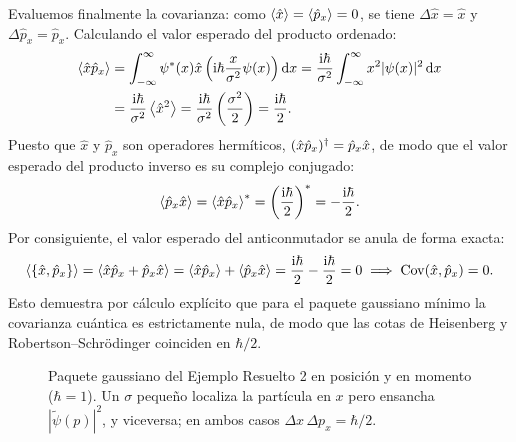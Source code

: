 \begin{ejemplobox}
    Evaluemos finalmente la covarianza: como $\left\langle \hat{x} \right\rangle = \left\langle \hat{p}_x \right\rangle = 0$, se tiene $\Delta\hat{x} = \hat{x}$ y $\Delta\hat{p}_x = \hat{p}_x$. Calculando el valor esperado del producto ordenado:
    \begin{align}
        \left\langle \hat{x}\hat{p}_x \right\rangle &= \int_{-\infty}^\infty \psi^*(x)\hat{x}\left(\mathrm{i}\hbar\frac{x}{\sigma^2}\psi(x)\right)\mathrm{d} x = \frac{\mathrm{i}\hbar}{\sigma^2}\int_{-\infty}^\infty x^2 |\psi(x)|^2\,\mathrm{d} x \nonumber\\
        &= \frac{\mathrm{i}\hbar}{\sigma^2}\left\langle \hat{x}^2 \right\rangle = \frac{\mathrm{i}\hbar}{\sigma^2}\left(\frac{\sigma^2}{2}\right) = \frac{\mathrm{i}\hbar}{2}.
        \label{a2-eq:xp_exp}
    \end{align}
    Puesto que $\hat{x}$ y $\hat{p}_x$ son operadores hermíticos, $(\hat{x}\hat{p}_x)^\dagger = \hat{p}_x\hat{x}$, de modo que el valor esperado del producto inverso es su complejo conjugado:
    \begin{equation}
        \left\langle \hat{p}_x\hat{x} \right\rangle = \left\langle \hat{x}\hat{p}_x \right\rangle^* = \left(\frac{\mathrm{i}\hbar}{2}\right)^* = -\frac{\mathrm{i}\hbar}{2}.
        \label{a2-eq:px_exp}
    \end{equation}
    Por consiguiente, el valor esperado del anticonmutador se anula de forma exacta:
    \begin{equation}
        \left\langle \{\hat{x}, \hat{p}_x\} \right\rangle = \left\langle \hat{x}\hat{p}_x + \hat{p}_x\hat{x} \right\rangle = \left\langle \hat{x}\hat{p}_x \right\rangle + \left\langle \hat{p}_x\hat{x} \right\rangle = \frac{\mathrm{i}\hbar}{2} - \frac{\mathrm{i}\hbar}{2} = 0 \implies \mathrm{Cov}(\hat{x}, \hat{p}_x) = 0.
    \end{equation}
    Esto demuestra por cálculo explícito que para el paquete gaussiano mínimo la covarianza cuántica es estrictamente nula, de modo que las cotas de Heisenberg y Robertson--Schrödinger coinciden en $\hbar/2$.
\end{ejemplobox}

\begin{figure}[H]
    \centering
    
    \caption{Paquete gaussiano del Ejemplo Resuelto 2 en posici\'on y en momento ($\hbar=1$). Un $\sigma$ peque\~no localiza la part\'icula en $x$ pero ensancha $|\tilde\psi(p)|^2$, y viceversa; en ambos casos $\Delta x\,\Delta p_x=\hbar/2$.}
    \label{fig:gauss_xp}
\end{figure}
